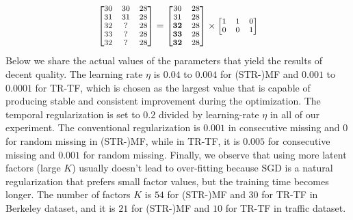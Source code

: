 \begin{equation}
\small
\label{temporalSplit_matrix}
\begin{bmatrix}
30 & 30 & 28\\
31 & 31 & 28\\
32 &  ? & 28\\
33 &  ? & 28\\
32 &  ? & 28\\
\end{bmatrix} 
= 
\begin{bmatrix}
30 & 28\\
31 & 28\\
\mathbf{32} & 28\\
\mathbf{33} & 28\\
\mathbf{32} & 28\\
\end{bmatrix} 
\times
\begin{bmatrix}
1 & 1 & 0\\
0 & 0 & 1\\
\end{bmatrix} 
\end{equation}
Below we share the actual values of the parameters that yield the results of decent quality.
The learning rate $\eta$ is $0.04$ to $0.004$ for (STR-)MF and $0.001$ to $0.0001$ for TR-TF, which is chosen as the largest value that is capable of producing stable and consistent improvement during the optimization.
The temporal regularization is set to $0.2$ divided by learning-rate $\eta$ in all of our experiment.
The conventional regularization is $0.001$ in consecutive missing and $0$ for random missing in (STR-)MF, while in TR-TF, it is $0.005$ for consecutive missing and $0.001$ for random missing.
Finally, we observe that using more latent factors (large $K$) usually doesn't lead to over-fitting because SGD is a natural regularization that prefers small factor values, but the training time becomes longer.
The number of factors $K$ is $54$ for (STR-)MF and $30$ for TR-TF in Berkeley dataset, and it is $21$ for (STR-)MF and $10$ for TR-TF in traffic dataset. 

